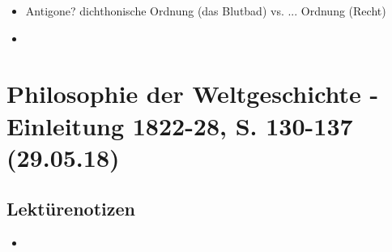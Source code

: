 \documentclass[emulatestandardclasses]{scrartcl}
\begin{document}
\begin{itemize}
  \item Antigone? dichthonische Ordnung (das Blutbad) vs. ... Ordnung (Recht)
  \item 
\end{itemize}



\section{Philosophie der Weltgeschichte - Einleitung 1822-28, S. 130-137\\(29.05.18)}

\subsection{Lektürenotizen}

\begin{itemize}
  \item 
\end{itemize}

%
%
%
%


\end{document}
